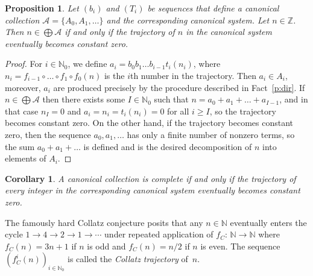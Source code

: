 \documentclass[12pt]{article}
\newtheorem{proposition}{Proposition}
\newtheorem{corollary}{Corollary}
\theoremstyle{definition}
\newcommand{\N}{\mathbb{N}}
\newcommand{\Z}{\mathbb{Z}}
\begin{document}
\begin{proposition}
Let $(b_i)$ and $(T_i)$ be sequences that define a canonical collection $\mathcal{A}=\{A_0,A_1,\ldots\}$ and the corresponding canonical system. Let $n\in\Z$. Then $n\in\bigoplus\mathcal{A}$ if and only if the trajectory of $n$ in the canonical system eventually becomes constant zero.
\end{proposition}
\begin{proof}
For $i\in\N_0$, we define $a_i = b_0b_1\dots b_{i-1}t_i(n_i)$, where $n_i = f_{i-1}\circ\dots\circ f_1\circ f_0(n)$ is the $i$th number in the trajectory. Then $a_i\in A_i$, moreover, $a_i$ are produced precisely by the procedure described in Fact~\ref{p:dir}. If $n\in\bigoplus\mathcal{A}$ then there exists some $I\in\N_0$ such that $n = a_0+a_1+\dots+a_{I-1}$, and in that case $n_I=0$ and $a_i=n_i=t_i(n_i)=0$ for all $i\geqslant I$, so the trajectory becomes constant zero. On the other hand, if the trajectory becomes constant zero, then the sequence $a_0,a_1,\dots$ has only a finite number of nonzero terms, so the sum $a_0+a_1+\dots$ is defined and is the desired decomposition of $n$ into elements of $A_i$.
\end{proof}
\begin{corollary}
\label{cor:coll-dyn}
A canonical collection is complete if and only if the trajectory of every integer in the corresponding canonical system eventually becomes constant zero.
\end{corollary}

The famously hard Collatz conjecture \cite{book:collatz} posits that any $n\in\N$ eventually enters the cycle $1\to4\to2\to1\to\dotsb$ under repeated application of $f_C\colon\,\N\to\N$ where $f_C(n)=3n+1$ if $n$ is odd and $f_C(n)=n/2$ if $n$ is even. The sequence $\left(f_C^i(n)\right)_{i\in\N_0}$ is called the \emph{Collatz trajectory} of~$n$.
\end{document}
